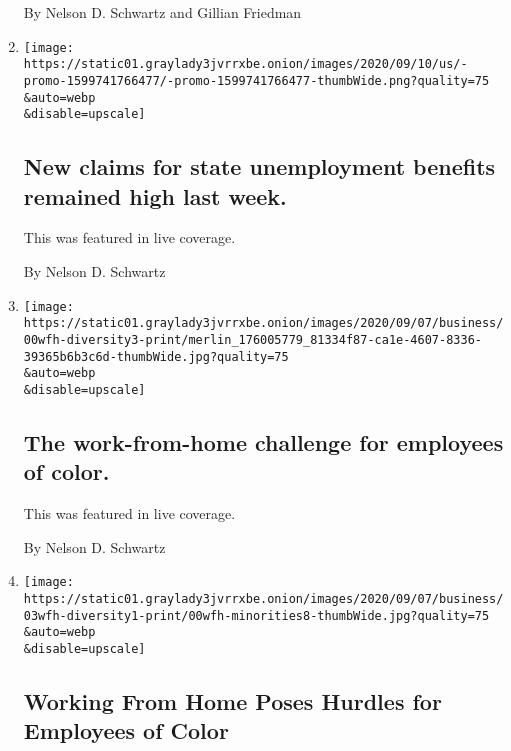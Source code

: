 \begin{enumerate}
  By Nelson D. Schwartz and Gillian Friedman
\item
  \href{/live/2020/09/10/business/stock-market-today-coronavirus/new-claims-for-state-unemployment-benefits-remained-high-last-week}{}

  \texttt{[image: https://static01.graylady3jvrrxbe.onion/images/2020/09/10/us/-promo-1599741766477/-promo-1599741766477-thumbWide.png?quality=75\\\&auto=webp\\\&disable=upscale]}

  \hypertarget{new-claims-for-state-unemployment-benefits-remained-high-last-week}{%
  \subsection{New claims for state unemployment benefits remained high
  last
  week.}\label{new-claims-for-state-unemployment-benefits-remained-high-last-week}}

  This was featured in live coverage.

  By Nelson D. Schwartz
\item
  \href{/live/2020/09/08/business/stock-market-today-coronavirus/the-work-from-home-challenge-for-employees-of-color}{}

  \texttt{[image: https://static01.graylady3jvrrxbe.onion/images/2020/09/07/business/00wfh-diversity3-print/merlin\_176005779\_81334f87-ca1e-4607-8336-39365b6b3c6d-thumbWide.jpg?quality=75\\\&auto=webp\\\&disable=upscale]}

  \hypertarget{the-work-from-home-challenge-for-employees-of-color}{%
  \subsection{The work-from-home challenge for employees of
  color.}\label{the-work-from-home-challenge-for-employees-of-color}}

  This was featured in live coverage.

  By Nelson D. Schwartz
\item
  \href{/2020/09/06/business/economy/working-from-home-diversity.html}{}

  \texttt{[image: https://static01.graylady3jvrrxbe.onion/images/2020/09/07/business/03wfh-diversity1-print/00wfh-minorities8-thumbWide.jpg?quality=75\\\&auto=webp\\\&disable=upscale]}

  \hypertarget{working-from-home-poses-hurdles-for-employees-of-color}{%
  \subsection{Working From Home Poses Hurdles for Employees of
  Color}\label{working-from-home-poses-hurdles-for-employees-of-color}}


\end{enumerate}
